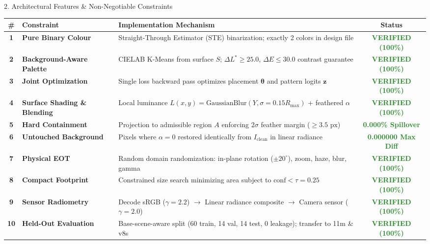 \documentclass[aspectratio=169, 10pt]{beamer}
\begin{document}
\begin{frame}[shrink=5]{2. Architectural Features \& Non-Negotiable Constraints}
\scriptsize
\begin{table}[h]
\centering
\renewcommand{\arraystretch}{1.15}
\begin{tabular}{@{}c p{3.2cm} p{5.5cm} c@{}}
\toprule
\textbf{\#} & \textbf{Constraint} & \textbf{Implementation Mechanism} & \textbf{Status} \\
\midrule
\rowcolor{LightSteel}
\textbf{1} & \textbf{Pure Binary Colour} & Straight-Through Estimator (STE) binarization; exactly 2 colors in design file & \textcolor{ForestGreen}{\textbf{VERIFIED (100\%)}} \\
\textbf{2} & \textbf{Background-Aware Palette} & CIELAB K-Means from surface $S$; $\Delta L^* \ge 25.0$, $\Delta E \le 30.0$ contrast guarantee & \textcolor{ForestGreen}{\textbf{VERIFIED (100\%)}} \\
\rowcolor{LightSteel}
\textbf{3} & \textbf{Joint Optimization} & Single loss backward pass optimizes placement $\bm{\theta}$ and pattern logits $\bm{z}$ & \textcolor{ForestGreen}{\textbf{VERIFIED (100\%)}} \\
\textbf{4} & \textbf{Surface Shading \& Blending} & Local luminance $L(x,y) = \text{GaussianBlur}(Y, \sigma=0.15 R_{\text{max}})$ + feathered $\alpha$ & \textcolor{ForestGreen}{\textbf{VERIFIED (100\%)}} \\
\rowcolor{LightSteel}
\textbf{5} & \textbf{Hard Containment} & Projection to admissible region $A$ enforcing $2\sigma$ feather margin ($\ge 3.5\text{ px}$) & \textcolor{ForestGreen}{\textbf{0.000\% Spillover}} \\
\textbf{6} & \textbf{Untouched Background} & Pixels where $\alpha=0$ restored identically from $I_{\text{clean}}$ in linear radiance & \textcolor{ForestGreen}{\textbf{0.000000 Max Diff}} \\
\rowcolor{LightSteel}
\textbf{7} & \textbf{Physical EOT} & Random domain randomization: in-plane rotation ($\pm 20^\circ$), zoom, haze, blur, gamma & \textcolor{ForestGreen}{\textbf{VERIFIED (100\%)}} \\
\textbf{8} & \textbf{Compact Footprint} & Constrained size search minimizing area subject to $\text{conf} < \tau = 0.25$ & \textcolor{ForestGreen}{\textbf{VERIFIED (100\%)}} \\
\rowcolor{LightSteel}
\textbf{9} & \textbf{Sensor Radiometry} & Decode sRGB ($\gamma=2.2$) $\to$ Linear radiance composite $\to$ Camera sensor ($\gamma=2.0$) & \textcolor{ForestGreen}{\textbf{VERIFIED (100\%)}} \\
\textbf{10} & \textbf{Held-Out Evaluation} & Base-scene-aware split (60 train, 14 val, 14 test, 0 leakage); transfer to 11m \& v8s & \textcolor{ForestGreen}{\textbf{VERIFIED (100\%)}} \\
\bottomrule
\end{tabular}
\end{table}
\end{frame}
\end{document}
